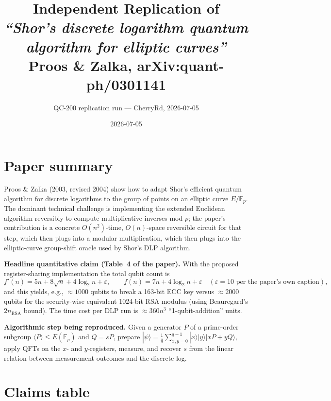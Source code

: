 \documentclass[10pt,letterpaper]{article}
\title{Independent Replication of\\
\emph{``Shor's discrete logarithm quantum algorithm for elliptic curves''}\\
Proos \& Zalka, arXiv:quant-ph/0301141}
\author{QC-200 replication run --- CherryRd, 2026-07-05}
\date{2026-07-05}
\begin{document}
\maketitle

\section{Paper summary}

Proos \& Zalka (2003, revised 2004) show how to adapt Shor's efficient
quantum algorithm for discrete logarithms to the group of points on an
elliptic curve $E/\mathbb{F}_p$.  The dominant technical challenge is
implementing the extended Euclidean algorithm reversibly to compute
multiplicative inverses mod $p$; the paper's contribution is a concrete
$O(n^2)$-time, $O(n)$-space reversible circuit for that step, which then
plugs into a modular multiplication, which then plugs into the elliptic-curve
group-shift oracle used by Shor's DLP algorithm.

\textbf{Headline quantitative claim (Table~4 of the paper).}  With the
proposed register-sharing implementation the total qubit count is
\[
  f'(n) = 5n + 8\sqrt{n} + 4\log_2 n + \varepsilon,\qquad
  f(n)  = 7n + 4\log_2 n + \varepsilon\quad(\varepsilon\!=\!10\text{ per the paper's own caption}),
\]
and this yields, e.g., $\approx 1000$ qubits to break a 163-bit ECC key
versus $\approx 2000$ qubits for the security-wise equivalent 1024-bit RSA
modulus (using Beauregard's $2n_{\text{RSA}}$ bound).  The time cost per
DLP run is $\approx 360 n^3$ ``1-qubit-addition'' units.

\textbf{Algorithmic step being reproduced.}  Given a generator $P$ of a
prime-order subgroup $\langle P\rangle\leq E(\mathbb{F}_p)$ and $Q=sP$,
prepare
\(
  |\psi\rangle
    = \frac{1}{q}\sum_{x,y=0}^{q-1}|x\rangle|y\rangle|xP+yQ\rangle,
\)
apply QFTs on the $x$- and $y$-registers, measure, and recover $s$ from
the linear relation between measurement outcomes and the discrete log.

\section{Claims table}
\end{document}

